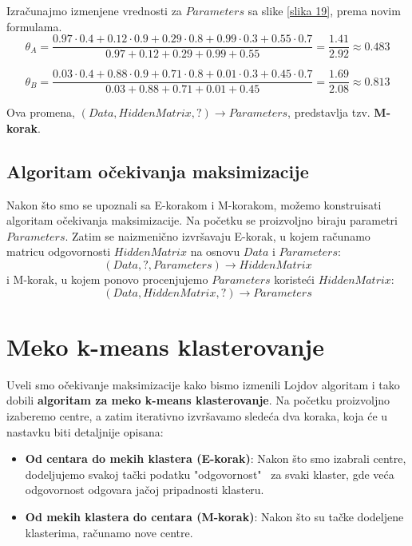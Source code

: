Izračunajmo izmenjene vrednosti za $Parameters$ sa slike \ref{slika 19}, prema novim formulama. 
$$\theta_A = \frac{0.97 \cdot 0.4 + 0.12 \cdot 0.9 + 0.29 \cdot 0.8 + 0.99 \cdot 0.3 + 0.55 \cdot 0.7}{0.97 + 0.12 + 0.29 + 0.99 + 0.55} = \frac{1.41}{2.92} \approx 0.483$$

$$\theta_B = \frac{0.03 \cdot 0.4 + 0.88 \cdot 0.9 + 0.71 \cdot 0.8 + 0.01 \cdot 0.3 + 0.45 \cdot 0.7}{0.03 + 0.88 + 0.71 + 0.01 + 0.45} = \frac{1.69}{2.08} \approx 0.813$$

Ova promena, $(Data, HiddenMatrix, ?) \rightarrow Parameters$, 	predstavlja tzv. \textbf{M-korak}.

\subsection{Algoritam očekivanja maksimizacije}

Nakon što smo se upoznali sa E-korakom i M-korakom, možemo konstruisati algoritam očekivanja maksimizacije.
Na početku se proizvoljno biraju parametri $Parameters$. Zatim se naizmenično izvršavaju E-korak, u kojem računamo matricu odgovornosti $HiddenMatrix$ na osnovu $Data$ i $Parameters$:
$$(Data, ?, Parameters) \rightarrow HiddenMatrix$$
i M-korak, u kojem ponovo procenjujemo $Parameters$ koristeći $HiddenMatrix$:
$$(Data, HiddenMatrix, ?) \rightarrow Parameters$$
 	
\section{Meko k-means klasterovanje}

Uveli smo očekivanje maksimizacije kako bismo izmenili Lojdov algoritam i tako dobili \textbf{algoritam za meko k-means klasterovanje}. Na početku proizvoljno izaberemo centre, a zatim iterativno izvršavamo sledeća dva koraka, koja će u nastavku biti detaljnije opisana:

\begin{itemize}
    \item \textbf{Od centara do mekih klastera (E-korak)}: Nakon što smo izabrali centre, dodeljujemo svakoj tački podatku "odgovornost" \ za svaki klaster, gde veća odgovornost odgovara jačoj pripadnosti klasteru.
    \item \textbf{Od mekih klastera do centara (M-korak)}: Nakon što su tačke dodeljene klasterima, računamo nove centre.
\end{itemize}

